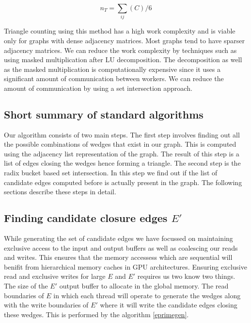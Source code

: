 \documentclass[conference]{IEEEtran}
\begin{document}
\begin{equation}
 n_{T} = \sum_{ij}(C)/6 \label{numTriangles}
\end{equation}

Triangle counting using this method has a high work complexity and is viable only for graphs with dense adjacency matrices. Most graphs tend to have sparser adjacency matrices. We can reduce the work complexity by techniques such as using masked multiplication after LU decomposition\cite{b10}. The decomposition as well as the masked multiplication is computationally expensive since it uses a significant amount of communication between workers. We can reduce the amount of communication by using a set intersection approach.

\subsection{Short summary of standard algorithms}
Our algorithm consists of two main steps. The first step involves finding out all the possible combinations of wedges that exist in our graph. This is computed using the adjacency list representation of the graph. The result of this step is a list of edges closing the wedges hence forming a triangle. The second step is the radix bucket based set intersection. In this step we find out if the list of candidate edges computed before is actually present in the graph. The following sections describe these steps in detail.

\subsection{Finding candidate closure edges $E'$}
While generating the set of candidate edges we have focussed on maintaining exclusive access to the input and output buffers as well as coalescing our reads and writes. This ensures that the memory accessess which are sequential  will benifit from hierarchical memory caches in GPU architectures. Ensuring exclusive read and exclusive writes for large $E$ and $E'$ requires us two know two things. The size of the $E'$ output buffer to allocate in the global memory. The read boundaries of $E$ in which each thread will operate to generate the wedges along with the write boundaries of $E'$ where it will write the candidate edges closing these wedges. This is performed by the algorithm \ref{eprimegen}.
\end{document}
